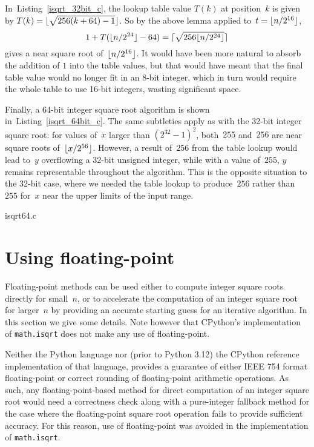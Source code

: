 \documentclass[a4paper]{article}
\DeclarePairedDelimiter\floor{\lfloor}{\rfloor}
\DeclarePairedDelimiter\ceil{\lceil}{\rceil}
\newcommand{\isqrt}[1]{\floor{\sqrt{#1}}}
\newcommand{\csqrt}[1]{\ceil{\sqrt{#1}}}
\theoremstyle{plain}
\theoremstyle{definition}
\begin{document}
In~Listing~\ref{isqrt_32bit_c}, the lookup table value $T(k)$ at position~$k$
is given by $T(k) = \isqrt{256(k + 64) - 1}$. So by the above lemma applied
to~$t=\floor{n / 2^{16}}$,
$$1 + T(\floor{n / 2^{24}} - 64) = \csqrt{256 \floor{n / 2^{24}}}$$ gives a
near square root of~$\floor{n / 2^{16}}$. It would have been more natural to
absorb the addition of $1$ into the table values, but that would have meant
that the final table value would no longer fit in an 8-bit integer, which in
turn would require the whole table to use 16-bit integers, wasting significant
space.

Finally, a 64-bit integer square root algorithm is shown
in~Listing~\ref{isqrt_64bit_c}. The same subtleties apply as with the 32-bit
integer square root: for values of~$x$ larger than $(2^32 - 1)^2$, both~$255$
and~$256$ are near square roots of~$\floor{x/2^{56}}$. However, a result
of~$256$ from the table lookup would lead to~$y$ overflowing a 32-bit
unsigned integer, while with a value of~$255$, $y$ remains representable
throughout the algorithm. This is the opposite situation to the 32-bit
case, where we needed the table lookup to produce~$256$ rather than $255$
for~$x$ near the upper limits of the input range.


  {isqrt64.c}

\section{Using floating-point}

Floating-point methods can be used either to compute integer square roots
directly for small~$n$, or to accelerate the computation of an integer square
root for larger~$n$ by providing an accurate starting guess for an iterative
algorithm. In this section we give some details. Note however that CPython's
implementation of \lstinline{math.isqrt} does not make any use of
floating-point.

Neither the Python language nor (prior to Python 3.12) the CPython
reference implementation of that language, provides a guarantee of either IEEE
754 format floating-point or correct rounding of floating-point arithmetic
operations. As such, any floating-point-based method for direct computation of
an integer square root would need a correctness check along with a pure-integer
fallback method for the case where the floating-point square root operation
fails to provide sufficient accuracy. For this reason, use of floating-point
was avoided in the implementation of \lstinline{math.isqrt}.
\end{document}
